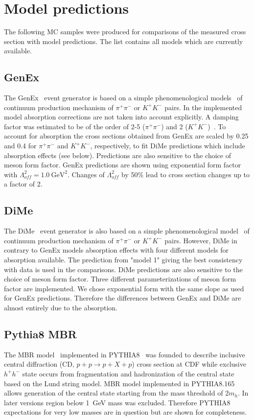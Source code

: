 \section{Model predictions}\label{sec:mcModelPred}

The following MC samples were produced for comparisons of the measured cross section with model predictions. The list contains all models which are currently available.

\subsection{GenEx}
The GenEx~\cite{GenEx} event generator is based on a simple phenomenological models~\cite{LSmodel, LSModelKK} of continuum production mechanism of $\pi^+\pi^-$ or $K^+K^-$ pairs. In the implemented model absorption corrections are not taken into account explicitly. A damping factor was estimated to be of the order of 2-5 ($\pi^+\pi^-$) and 2 ($K^+K^-$)~\cite{LSAbsorption}. To account for absorption the cross sections obtained from GenEx are scaled by 0.25 and 0.4 for $\pi^+\pi^-$ and $K^+K^-$, respectively, to fit DiMe predictions which include absorption effects (see below). Predictions are also sensitive to the choice of meson form factor. GenEx predictions are shown using exponential form factor with $\Lambda_{of\!f}^{2}=1.0~\textrm{GeV}^{2}$. Changes of $\Lambda_{of\!f}^{2}$ by 50\% lead to cross section changes up to a factor of 2.

\subsection{DiMe}
The DiMe~\cite{DurhamModel} event generator is also based on a simple phenomenological model~\cite{harland_lang_1} of continuum production mechanism of $\pi^+\pi^-$ or $K^+K^-$ pairs. However, DiMe in contrary to GenEx models absorption effects with four different models for absorption available. The prediction from "model 1" giving the best consistency with data is used in the comparisons. DiMe predictions are also sensitive to the choice of meson form factor. Three different parameterizations of meson form factor are implemented. We chose exponential form with the same slope as used for GenEx predictions. Therefore the differences between GenEx and DiMe are almost entirely due to the absorption.

\subsection{Pythia8 MBR}
The MBR model~\cite{mbr_pythia8} implemented in PYTHIA8~\cite{pythia8} was founded to describe inclusive 
central diffraction (CD, $p+p\rightarrow p+X+p$) cross section at CDF while exclusive $h^+h^-$ state occurs from fragmentation and hadronization of the central state based on the Lund string model. MBR model implemented in PYTHIA8.165 allows generation of the central state starting from the mass threshold of $2 m_h$. In later versions region below 1~GeV mass was excluded. Therefore PYTHIA8 expectations for very low masses are in question but are shown for completeness.
